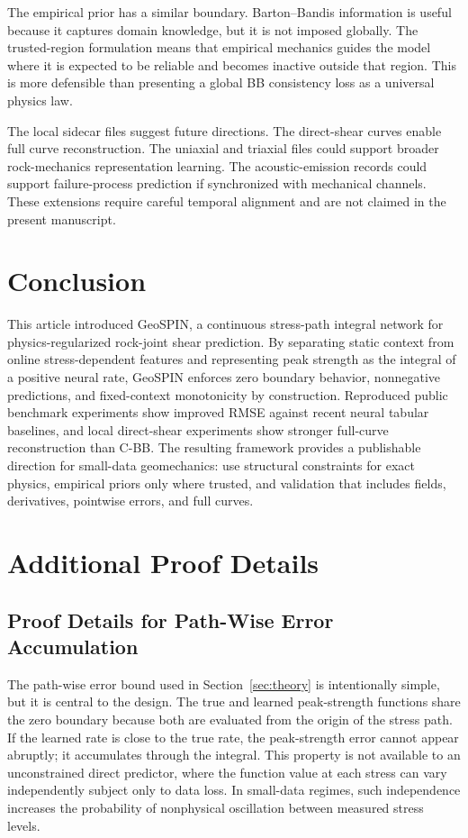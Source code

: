 \documentclass[journal]{IEEEtran}
\begin{document}
The empirical prior has a similar boundary. Barton--Bandis information is useful because it captures domain knowledge, but it is not imposed globally. The trusted-region formulation means that empirical mechanics guides the model where it is expected to be reliable and becomes inactive outside that region. This is more defensible than presenting a global BB consistency loss as a universal physics law.

The local sidecar files suggest future directions. The direct-shear curves enable full curve reconstruction. The uniaxial and triaxial files could support broader rock-mechanics representation learning. The acoustic-emission records could support failure-process prediction if synchronized with mechanical channels. These extensions require careful temporal alignment and are not claimed in the present manuscript.

\section{Conclusion}
This article introduced GeoSPIN, a continuous stress-path integral network for physics-regularized rock-joint shear prediction. By separating static context from online stress-dependent features and representing peak strength as the integral of a positive neural rate, GeoSPIN enforces zero boundary behavior, nonnegative predictions, and fixed-context monotonicity by construction. Reproduced public benchmark experiments show improved RMSE against recent neural tabular baselines, and local direct-shear experiments show stronger full-curve reconstruction than C-BB. The resulting framework provides a publishable direction for small-data geomechanics: use structural constraints for exact physics, empirical priors only where trusted, and validation that includes fields, derivatives, pointwise errors, and full curves.

\appendices
\section{Additional Proof Details}
\subsection{Proof Details for Path-Wise Error Accumulation}
The path-wise error bound used in Section~\ref{sec:theory} is intentionally simple, but it is central to the design. The true and learned peak-strength functions share the zero boundary because both are evaluated from the origin of the stress path. If the learned rate is close to the true rate, the peak-strength error cannot appear abruptly; it accumulates through the integral. This property is not available to an unconstrained direct predictor, where the function value at each stress can vary independently subject only to data loss. In small-data regimes, such independence increases the probability of nonphysical oscillation between measured stress levels.
\end{document}
